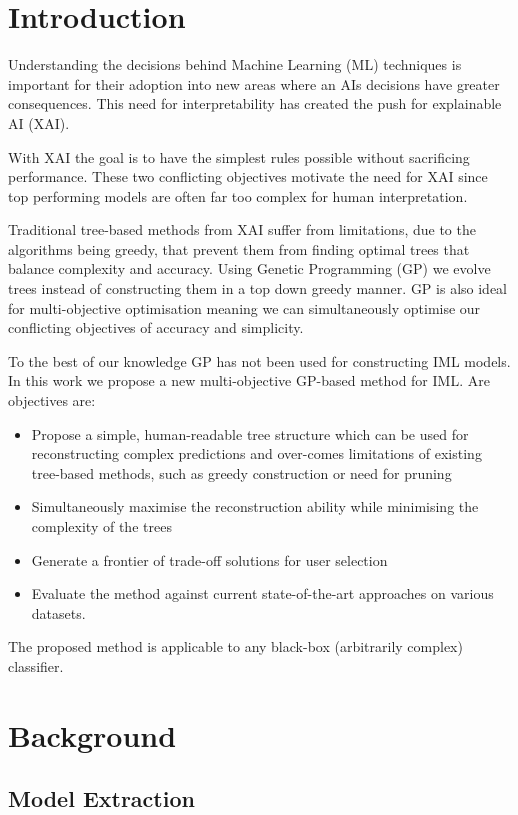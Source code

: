 \section{Introduction} 
Understanding the decisions behind Machine Learning (ML) techniques is important for their adoption into new areas where an AI\textquotesingle s decisions have greater consequences. This need for interpretability has created the push for explainable AI (XAI). 

With XAI the goal is to have the simplest rules possible without sacrificing performance. These two conflicting objectives motivate the need for XAI since top performing models are often far too complex for human interpretation.

Traditional tree-based methods from XAI suffer from limitations, due to the algorithms being greedy, that prevent them from finding optimal trees that balance complexity and accuracy. Using Genetic Programming (GP) we evolve trees instead of constructing them in a top down greedy manner. GP is also ideal for multi-objective optimisation meaning we can simultaneously optimise our conflicting objectives of accuracy and simplicity. 

To the best of our knowledge GP has not been used for constructing IML models. In this work we propose a new multi-objective GP-based method for IML. Are objectives are:  
\begin{itemize}
  \item Propose a simple, human-readable tree structure which can be used for reconstructing complex predictions and over-comes limitations of existing tree-based methods, such as greedy construction or need for pruning
  \item Simultaneously maximise the reconstruction ability while minimising the complexity of the trees
  \item Generate a frontier of trade-off solutions for user selection
  \item Evaluate the method against current state-of-the-art approaches on various datasets. 
\end{itemize}
The proposed method is applicable to any black-box (arbitrarily complex) classifier.


\section{Background}
\subsection{Model Extraction}
